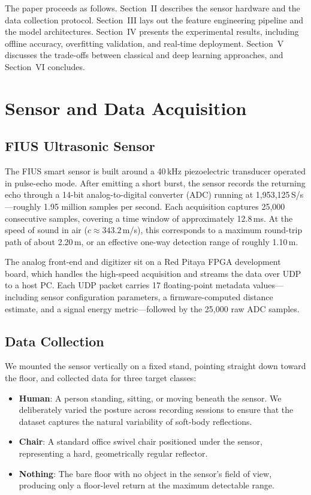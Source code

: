 \documentclass[conference,a4paper]{IEEEtran}
\begin{document}
The paper proceeds as follows. Section~II describes the sensor hardware and the data collection protocol. Section~III lays out the feature engineering pipeline and the model architectures. Section~IV presents the experimental results, including offline accuracy, overfitting validation, and real-time deployment. Section~V discusses the trade-offs between classical and deep learning approaches, and Section~VI concludes.

\section{Sensor and Data Acquisition}

\subsection{FIUS Ultrasonic Sensor}

The FIUS smart sensor is built around a 40\,kHz piezoelectric transducer operated in pulse-echo mode. After emitting a short burst, the sensor records the returning echo through a 14-bit analog-to-digital converter (ADC) running at 1,953,125\,S/s---roughly 1.95 million samples per second. Each acquisition captures 25,000 consecutive samples, covering a time window of approximately 12.8\,ms. At the speed of sound in air ($c \approx 343.2$\,m/s), this corresponds to a maximum round-trip path of about 2.20\,m, or an effective one-way detection range of roughly 1.10\,m.

The analog front-end and digitizer sit on a Red Pitaya FPGA development board, which handles the high-speed acquisition and streams the data over UDP to a host PC. Each UDP packet carries 17 floating-point metadata values---including sensor configuration parameters, a firmware-computed distance estimate, and a signal energy metric---followed by the 25,000 raw ADC samples.

\subsection{Data Collection}

We mounted the sensor vertically on a fixed stand, pointing straight down toward the floor, and collected data for three target classes:

\begin{itemize}
    \item \textbf{Human}: A person standing, sitting, or moving beneath the sensor. We deliberately varied the posture across recording sessions to ensure that the dataset captures the natural variability of soft-body reflections.
    \item \textbf{Chair}: A standard office swivel chair positioned under the sensor, representing a hard, geometrically regular reflector.
    \item \textbf{Nothing}: The bare floor with no object in the sensor's field of view, producing only a floor-level return at the maximum detectable range.
\end{itemize}
\end{document}
